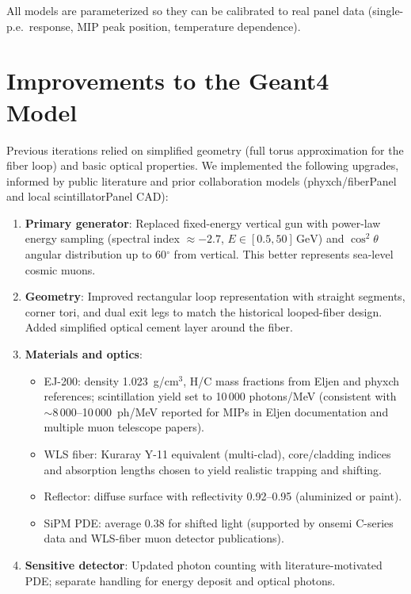 \documentclass[11pt,a4paper]{article}
\begin{document}
All models are parameterized so they can be calibrated to real panel data (single-p.e.\ response, MIP peak position, temperature dependence).

\section{Improvements to the Geant4 Model}

Previous iterations relied on simplified geometry (full torus approximation for the fiber loop) and basic optical properties. We implemented the following upgrades, informed by public literature and prior collaboration models (phyxch/fiberPanel and local scintillatorPanel CAD):

\begin{enumerate}
  \item \textbf{Primary generator}: Replaced fixed-energy vertical gun with power-law energy sampling (spectral index $\approx -2.7$, $E \in [0.5,50]\,\mathrm{GeV}$) and $\cos^2\theta$ angular distribution up to 60$^\circ$ from vertical. This better represents sea-level cosmic muons.
  \item \textbf{Geometry}: Improved rectangular loop representation with straight segments, corner tori, and dual exit legs to match the historical looped-fiber design. Added simplified optical cement layer around the fiber.
  \item \textbf{Materials and optics}:
    \begin{itemize}
      \item EJ-200: density 1.023~g/cm$^3$, H/C mass fractions from Eljen and phyxch references; scintillation yield set to 10\,000 photons/MeV (consistent with $\sim$8\,000--10\,000~ph/MeV reported for MIPs in Eljen documentation and multiple muon telescope papers).
      \item WLS fiber: Kuraray Y-11 equivalent (multi-clad), core/cladding indices and absorption lengths chosen to yield realistic trapping and shifting.
      \item Reflector: diffuse surface with reflectivity 0.92--0.95 (aluminized or paint).
      \item SiPM PDE: average 0.38 for shifted light (supported by onsemi C-series data and WLS-fiber muon detector publications).
    \end{itemize}
  \item \textbf{Sensitive detector}: Updated photon counting with literature-motivated PDE; separate handling for energy deposit and optical photons.
\end{enumerate}
\end{document}
